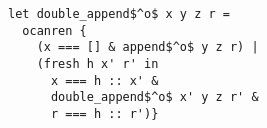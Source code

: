 \begin{lstlisting}
let double_append$^o$ x y z r =
  ocanren {
    (x === [] & append$^o$ y z r) |
    (fresh h x' r' in
      x === h :: x' &
      double_append$^o$ x' y z r' &
      r === h :: r')}
\end{lstlisting}
